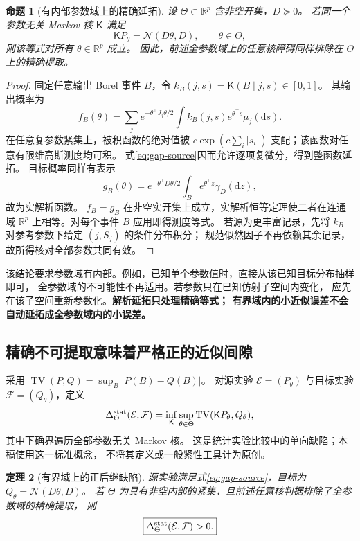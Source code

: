 \documentclass[UTF8,fontset=fandol,zihao=5,a4paper]{ctexart}
\newtheorem{theorem}{定理}[section]
\newtheorem{proposition}[theorem]{命题}
\theoremstyle{definition}
\theoremstyle{remark}\newtheorem{remark}[theorem]{说明}
\numberwithin{equation}{section}
\begin{document}
\begin{proposition}[有内部参数域上的精确延拓]
\label{prop:exact-domain-extension}
设 $\Theta\subset\mathbb R^p$ 含非空开集，$D\succeq0$。
若同一个参数无关 Markov 核 $\mathsf K$ 满足
\[
 \mathsf K P_\theta=\mathcal N(D\theta,D),
 \qquad \theta\in\Theta,
\]
则该等式对所有 $\theta\in\mathbb R^p$ 成立。
因此，前述全参数域上的任意核障碍同样排除在 $\Theta$ 上的精确提取。
\end{proposition}

\begin{proof}
固定任意输出 Borel 事件 $B$，令
$k_B(j,s)=\mathsf K(B\mid j,s)\in[0,1]$。
其输出概率为
\[
 f_B(\theta)=\sum_j e^{-\theta^\top J_j\theta/2}
 \int k_B(j,s)e^{\theta^\top s}\mu_j(\mathrm ds).
\]
在任意复参数紧集上，被积函数的绝对值被
$c\exp(c\sum_i|s_i|)$ 支配；该函数对任意有限维高斯测度均可积。
式\eqref{eq:gap-source}因而允许逐项复微分，得到整函数延拓。
目标概率同样有表示
\[
 g_B(\theta)=e^{-\theta^\top D\theta/2}
 \int_B e^{\theta^\top z}\gamma_D(\mathrm dz),
\]
故为实解析函数。
$f_B=g_B$ 在非空实开集上成立，实解析恒等定理使二者在连通域
$\mathbb R^p$ 上相等。对每个事件 $B$ 应用即得测度等式。
若源为更丰富记录，先将 $k_B$ 对参考参数下给定 $(j,S_j)$ 的条件分布积分；
规范似然因子不再依赖其余记录，故所得核对全部参数共同有效。
\end{proof}

该结论要求参数域有内部。例如，已知单个参数值时，直接从该已知目标分布抽样即可，
全参数域的不可能性不再适用。若参数只在已知仿射子空间内变化，
应先在该子空间重新参数化。\textbf{解析延拓只处理精确等式；
有界域内的小近似误差不会自动延拓成全参数域内的小误差。}

\subsection{精确不可提取意味着严格正的近似间隙}

采用 $\operatorname{TV}(P,Q)=\sup_B|P(B)-Q(B)|$。
对源实验 $\mathcal E=(P_\theta)$ 与目标实验 $\mathcal F=(Q_\theta)$，定义
\begin{equation}
 \Delta_\Theta^{\rm stat}(\mathcal E,\mathcal F)
 =\inf_{\mathsf K}\sup_{\theta\in\Theta}
 \operatorname{TV}(\mathsf K P_\theta,Q_\theta),
 \label{eq:gap-deficiency}
\end{equation}
其中下确界遍历全部参数无关 Markov 核。
这是统计实验比较中的单向缺陷\cite{torgersen}；本稿使用这一标准概念，
不将其定义或一般紧性工具计为原创。

\begin{theorem}[有界域上的正后继缺陷]
\label{thm:positive-compact-gap}
源实验满足式\eqref{eq:gap-source}，目标为
$Q_\theta=\mathcal N(D\theta,D)$。
若 $\Theta$ 为具有非空内部的紧集，且前述任意核判据排除了全参数域的精确提取，
则
\begin{equation}
 \boxed{\Delta_\Theta^{\rm stat}(\mathcal E,\mathcal F)>0.}
 \label{eq:strict-positive-gap}
\end{equation}
\end{theorem}
\end{document}
